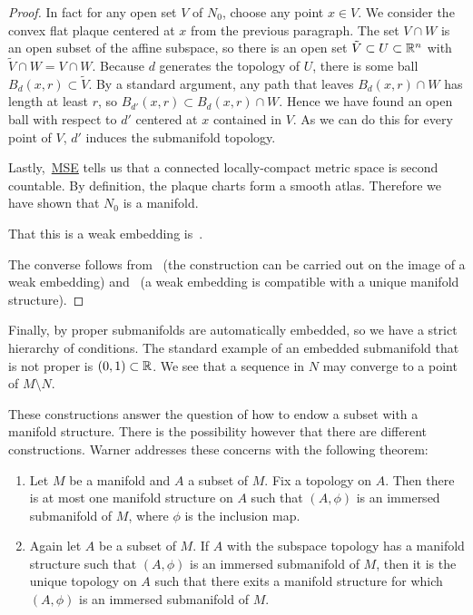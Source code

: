 \begin{proof}
In fact for any open set $V$ of $N_0$, choose any point $x \in V$.
We consider the convex flat plaque centered at $x$ from the previous paragraph.
The set $V \cap W$ is an open subset of the affine subspace, so there is an open set $\tilde{V} \subset U \subset \mathbb{R}^n$ with $\tilde{V} \cap W = V \cap W$.
Because $d$ generates the topology of $U$, there is some ball $B_d(x,r) \subset \tilde{V}$.
By a standard argument, any path that leaves $B_d(x,r) \cap W$ has length at least $r$, so $B_{d'}(x,r) \subset B_d(x,r) \cap W$. 
Hence we have found an open ball with respect to $d'$ centered at $x$ contained in $V$.
As we can do this for every point of $V$, $d'$ induces the submanifold topology.

Lastly,~\href{https://math.stackexchange.com/questions/10885/non-separable-locally-compact-connected-metric-space}{MSE} tells us that a connected locally-compact metric space is second countable.
By definition, the plaque charts form a smooth atlas.
Therefore we have shown that $N_0$ is a manifold.

That this is a weak embedding is~\cite[Thm~1.2.7(iii)]{Kolar1993}.

The converse follows from~\cite[I.2.15~Lemma]{Kolar1993} (the construction can be carried out on the image of a weak embedding) and~\cite[Lemma~1.1.41]{Sharpe1997} (a weak embedding is compatible with a unique manifold structure).
\end{proof}

Finally, by \cite[Thm~1.2.11]{Sharpe1997} proper submanifolds are automatically embedded, so we have a strict hierarchy of conditions.
The standard example of an embedded submanifold that is not proper is $(0,1) \subset \mathbb{R}$.
We see that a sequence in $N$ may converge to a point of $M\setminus N$.

These constructions answer the question of how to endow a subset with a manifold structure.
There is the possibility however that there are different constructions.
Warner addresses these concerns with the following theorem: 
\begin{theorem}
\label{thm:submanifolds}
\textup{\cite[Remark~1.33]{Warner1983}}
\begin{enumerate}
\item Let $M$ be a manifold and $A$ a subset of $M$. Fix a topology on $A$. Then there is at most one manifold structure on $A$ such that $(A,\phi)$ is an immersed submanifold of $M$, where $\phi$ is the inclusion map.
\item Again let $A$ be a subset of $M$. If $A$ with the subspace topology has a manifold structure such that $(A,\phi)$ is an immersed submanifold of $M$, then it is the unique topology on $A$ such that there exits a manifold structure for which $(A,\phi)$ is an immersed submanifold of $M$.
\end{enumerate}
\end{theorem}

